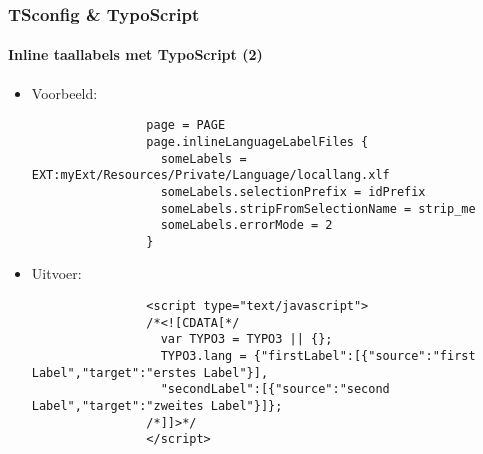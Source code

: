 \begin{frame}[fragile]
	\frametitle{TSconfig \& TypoScript}
	\framesubtitle{Inline taallabels met TypoScript (2)}

	\lstset{basicstyle=\tiny\ttfamily}

	\begin{itemize}

		\item Voorbeeld:

			\begin{lstlisting}
				page = PAGE
				page.inlineLanguageLabelFiles {
				  someLabels = EXT:myExt/Resources/Private/Language/locallang.xlf
				  someLabels.selectionPrefix = idPrefix
				  someLabels.stripFromSelectionName = strip_me
				  someLabels.errorMode = 2
				}
			\end{lstlisting}

		\item Uitvoer:

			\begin{lstlisting}
				<script type="text/javascript">
				/*<![CDATA[*/
				  var TYPO3 = TYPO3 || {};
				  TYPO3.lang = {"firstLabel":[{"source":"first Label","target":"erstes Label"}],
				  "secondLabel":[{"source":"second Label","target":"zweites Label"}]};
				/*]]>*/
				</script>
			\end{lstlisting}

	\end{itemize}

\end{frame}

